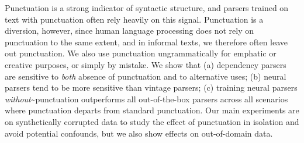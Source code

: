 Punctuation is a strong indicator of syntactic structure, and parsers trained on text with punctuation often rely heavily on this signal. Punctuation is a diversion, however, since human language processing does not rely on punctuation to the same extent, and in informal texts, we therefore often leave out punctuation. We also use punctuation ungrammatically for emphatic or creative purposes, or simply by mistake. We show that (a) dependency parsers are sensitive to {\em both} absence of punctuation and to alternative uses; (b) neural parsers tend to be more sensitive than vintage parsers; (c) training neural parsers {\em without}{\textasciitilde}punctuation outperforms all out-of-the-box parsers across all scenarios where punctuation departs from standard  punctuation. Our main experiments are on synthetically corrupted data to study the effect of punctuation in isolation and avoid potential confounds, but we also show effects on out-of-domain data.
